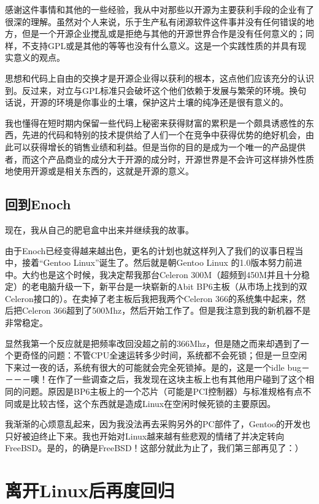 感谢这件事情和其他的一些经验，我从中对那些以开源为主要获利手段的企业有了很深的理解。虽然对个人来说，乐于生产私有闭源软件这件事并没有任何错误的地方，但是一个开源企业搅乱或是拒绝与其他的开源世界合作是没有任何意义的；同样，不支持GPL或是其他的等等也没有什么意义。这是一个实践性质的并具有现实意义的观点。

思想和代码上自由的交换才是开源企业得以获利的根本，这点他们应该充分的认识到。反过来，对立与GPL标准只会破坏这个他们依赖于发展与繁荣的环境。换句话说，开源的环境是你事业的土壤，保护这片土壤的纯净还是很有意义的。

我也懂得在短时期内保留一些代码上秘密来获得财富的累积是一个颇具诱惑性的东西，先进的代码和特别的技术提供给了人们一个在竞争中获得优势的绝好机会，由此可以获得增长的销售业绩和利益。但是当你的目的是成为一个唯一的产品提供者，而这个产品商业的成分大于开源的成分时，开源世界是不会许可这样排外性质地使用开源或是相关东西的，这就是开源的意义。

\subsection{回到Enoch}

现在，我从自己的肥皂盒中出来并继续我的故事。 

由于Enoch已经变得越来越出色，更名的计划也就这样列入了我们的议事日程当中，接着“Gentoo Linux”诞生了。然后就是朝Gentoo Linux 的1.0版本努力前进中。大约也是这个时候，我决定帮我那台Celeron 300M（超频到450M并且十分稳定）的老电脑升级一下，新平台是一块崭新的Abit BP6主板（从市场上找到的双Celeron接口的）。在卖掉了老主板后我把我两个Celeron 366的系统集中起来，然后把Celeron 366超到了500Mhz，然后开始工作了。但是我注意到我的新机器不是非常稳定。 

显然我第一个反应就是把频率改回没超之前的366Mhz，但是随之而来却遇到了一个更奇怪的问题：不管CPU全速运转多少时间，系统都不会死锁；但是一旦空闲下来过一夜的话，系统有很大的可能就会完全死锁掉。是的，这是一个idle bug－－－－噢！在作了一些调查之后，我发现在这块主板上也有其他用户碰到了这个相同的问题。原因是BP6主板上的一个芯片（可能是PCI控制器）与标准规格有点不同或是比较古怪，这个东西就是造成Linux在空闲时候死锁的主要原因。

我渐渐的心烦意乱起来，因为我没法再去采购另外的PC部件了，Gentoo的开发也只好被迫终止下来。我也开始对Linux越来越有些悲观的情绪了并决定转向FreeBSD。是的，的确是FreeBSD！这部分就此为止了，我们第三部再见了：）

\section{离开Linux后再度回归}


